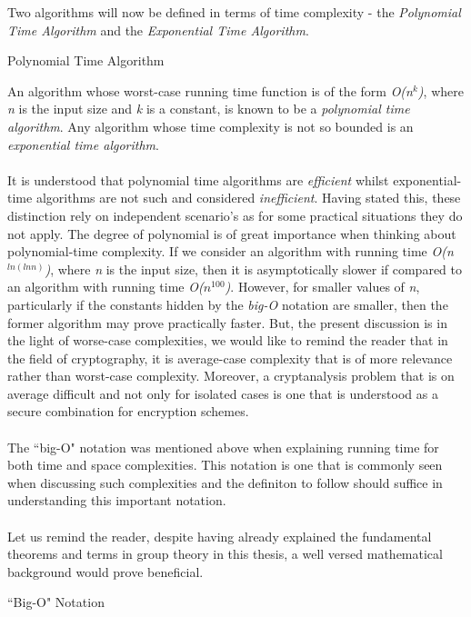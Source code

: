 \documentclass[iwp,first]{luthesis}
\begin{document}
Two algorithms will now be defined in terms of time complexity - the \textit{Polynomial Time Algorithm} and the \textit{Exponential Time Algorithm}.

\begin{mydef}
Polynomial Time Algorithm
\end{mydef}

An algorithm whose worst-case running time function is of the form \textit{O(n$^k$)}, where \textit{n} is the input size and \textit{k} is a constant, is known to be a \textit{polynomial time algorithm}. Any algorithm whose time complexity is not so bounded is an \textit{exponential time algorithm}.
\\
\\
It is understood that polynomial time algorithms are \textit{efficient} whilst exponential-time algorithms are not such and considered \textit{inefficient}. Having stated this, these distinction rely on independent scenario's as for some practical situations they do not apply. The degree of polynomial is of great importance when thinking about polynomial-time complexity. If we consider an algorithm with running time \textit{O(n$^{ln(lnn)}$)}, where \textit{n} is the input size, then it is asymptotically slower if compared to an algorithm with running time \textit{O($n^{100}$)}. However, for smaller values of \textit{n}, particularly if the constants hidden by the \textit{big-O} notation are smaller, then the former algorithm may prove practically faster. But, the present discussion is in the light of worse-case complexities, we would like to remind the reader that in the field of cryptography, it is average-case complexity that is of more relevance rather than worst-case complexity. Moreover, a cryptanalysis problem that is on average difficult and not only for isolated cases is one that is understood as a secure combination for encryption schemes.
\\
\\
The ``big-O" notation was mentioned above when explaining running time for both time and space complexities. This notation is one that is commonly seen when discussing such complexities and the definiton to follow should suffice in understanding this important notation.
\\
\\
Let us remind the reader, despite having already explained the fundamental theorems and terms in group theory in this thesis, a well versed mathematical background would prove beneficial. 

\begin{mydef}
``Big-O" Notation
\end{mydef}
\end{document}
